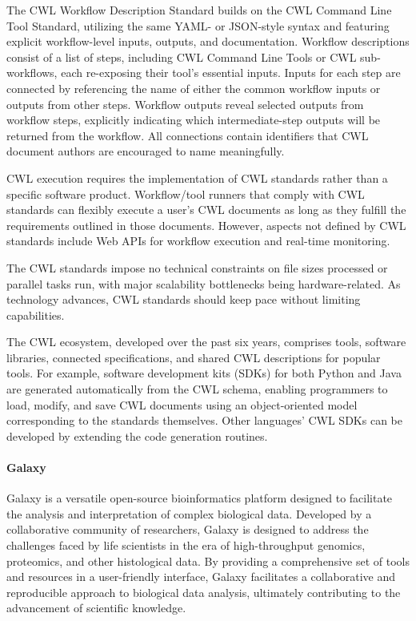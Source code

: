                 The CWL Workflow Description Standard builds on the CWL Command Line Tool Standard, utilizing the same YAML- or JSON-style syntax and featuring explicit workflow-level inputs, outputs, and documentation. Workflow descriptions consist of a list of steps, including CWL Command Line Tools or CWL sub-workflows, each re-exposing their tool's essential inputs. Inputs for each step are connected by referencing the name of either the common workflow inputs or outputs from other steps. Workflow outputs reveal selected outputs from workflow steps, explicitly indicating which intermediate-step outputs will be returned from the workflow. All connections contain identifiers that CWL document authors are encouraged to name meaningfully.
    
                CWL execution requires the implementation of CWL standards rather than a specific software product. Workflow/tool runners that comply with CWL standards can flexibly execute a user's CWL documents as long as they fulfill the requirements outlined in those documents. However, aspects not defined by CWL standards include Web APIs for workflow execution and real-time monitoring.
    
                The CWL standards impose no technical constraints on file sizes processed or parallel tasks run, with major scalability bottlenecks being hardware-related. As technology advances, CWL standards should keep pace without limiting capabilities.
    
                The CWL ecosystem, developed over the past six years, comprises tools, software libraries, connected specifications, and shared CWL descriptions for popular tools. For example, software development kits (SDKs) for both Python and Java are generated automatically from the CWL schema, enabling programmers to load, modify, and save CWL documents using an object-oriented model corresponding to the standards themselves. Other languages' CWL SDKs can be developed by extending the code generation routines.
    
            \paragraph*{Galaxy}
            
                Galaxy is a versatile open-source bioinformatics platform designed to facilitate the analysis and interpretation of complex biological data. Developed by a collaborative community of researchers, Galaxy is designed to address the challenges faced by life scientists in the era of high-throughput genomics, proteomics, and other histological data\cite{galaxy2022galaxy}.
                By providing a comprehensive set of tools and resources in a user-friendly interface, Galaxy facilitates a collaborative and reproducible approach to biological data analysis, ultimately contributing to the advancement of scientific knowledge.
        
